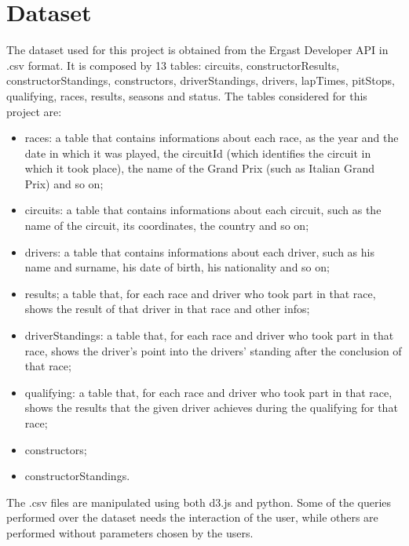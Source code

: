 \documentclass[11pt,twocolumn,letterpaper]{article}
\begin{document}
\section{Dataset}
The dataset used for this project is obtained from the Ergast Developer API \cite{Dataset} in .csv format. It is composed by 13 tables: circuits,
constructorResults, constructorStandings, constructors, driverStandings, drivers, lapTimes, pitStops, qualifying, races, results, seasons and status. The tables considered
for this project are:
\begin{itemize}
	\item races: a table that contains informations about each race, as the year and the date in which it was played, the circuitId (which identifies the circuit in which it took place), the name of the Grand Prix (such as Italian Grand Prix) and so on;
	\item circuits: a table that contains informations about each circuit, such as the name of the circuit, its coordinates, the country and so on;
	\item drivers: a table that contains informations about each driver, such as his name and surname, his date of birth, his nationality and so on;
	\item results; a table that, for each race and driver who took part in that race, shows the result of that driver in that race and other infos;
	\item driverStandings: a table that, for each race and driver who took part in that race, shows the driver's point into the drivers' standing after the conclusion of that
	race;
	\item qualifying: a table that, for each race and driver who took part in that race, shows the results that the given driver achieves during the qualifying for that race;
	\item constructors;
	\item constructorStandings. 
\end{itemize}
The .csv files are manipulated using both d3.js and python. Some of the queries performed over the dataset needs the interaction of the user, while others are performed
without parameters chosen by the users.
\end{document}
